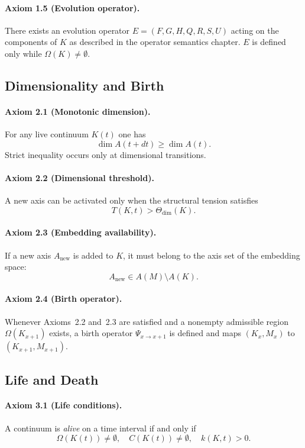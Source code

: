 \paragraph{Axiom 1.5 (Evolution operator).}
There exists an evolution operator
\(E = (F,G,H,Q,R,S,U)\) acting on the components of \(K\) as described in
the operator semantics chapter.  \(E\) is defined only while
\(\Omega(K)\neq\emptyset\).

\subsection{Dimensionality and Birth}

\paragraph{Axiom 2.1 (Monotonic dimension).}
For any live continuum \(K(t)\) one has
\[
  \dim A(t+dt) \ge \dim A(t).
\]
Strict inequality occurs only at dimensional transitions.

\paragraph{Axiom 2.2 (Dimensional threshold).}
A new axis can be activated only when the structural tension satisfies
\[
  T(K,t) > \Theta_{\mathrm{dim}}(K).
\]

\paragraph{Axiom 2.3 (Embedding availability).}
If a new axis \(A_{\mathrm{new}}\) is added to \(K\), it must belong to the
axis set of the embedding space:
\[
  A_{\mathrm{new}}\in A(M)\setminus A(K).
\]

\paragraph{Axiom 2.4 (Birth operator).}
Whenever Axioms~2.2 and~2.3 are satisfied and a nonempty admissible region
\(\Omega(K_{x+1})\) exists, a birth operator \(\Psi_{x\to x+1}\) is defined and
maps \((K_x,M_x)\) to \((K_{x+1},M_{x+1})\).

\subsection{Life and Death}

\paragraph{Axiom 3.1 (Life conditions).}
A continuum is \emph{alive} on a time interval if and only if
\[
  \Omega(K(t))\neq\emptyset,\quad
  C(K(t))\neq\emptyset,\quad
  k(K,t)>0.
\]

